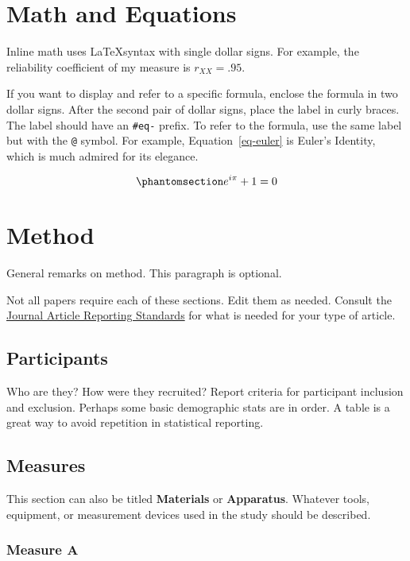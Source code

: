 \documentclass[
  man,
  longtable,
  nolmodern,
  notxfonts,
  notimes,
  colorlinks=true,linkcolor=blue,citecolor=blue,urlcolor=blue]{apa7}
\begin{document}
\section{Math and Equations}\label{math-and-equations}

Inline math uses \LaTeX syntax with single dollar signs. For example,
the reliability coefficient of my measure is \(r_{XX}=.95\).

If you want to display and refer to a specific formula, enclose the
formula in two dollar signs. After the second pair of dollar signs,
place the label in curly braces. The label should have an \texttt{\#eq-}
prefix. To refer to the formula, use the same label but with the
\texttt{@} symbol. For example, Equation~\ref{eq-euler} is Euler's
Identity, which is much admired for its elegance.

\begin{equation}\phantomsection\label{eq-euler}{
e^{i\pi}+1=0
}\end{equation}

\section{Method}\label{method}

General remarks on method. This paragraph is optional.

Not all papers require each of these sections. Edit them as needed.
Consult the \href{https://apastyle.apa.org/jars}{Journal Article
Reporting Standards} for what is needed for your type of article.

\subsection{Participants}\label{participants}

Who are they? How were they recruited? Report criteria for participant
inclusion and exclusion. Perhaps some basic demographic stats are in
order. A table is a great way to avoid repetition in statistical
reporting.

\subsection{Measures}\label{measures}

This section can also be titled \textbf{Materials} or
\textbf{Apparatus}. Whatever tools, equipment, or measurement devices
used in the study should be described.

\subsubsection{Measure A}\label{measure-a}
\end{document}
